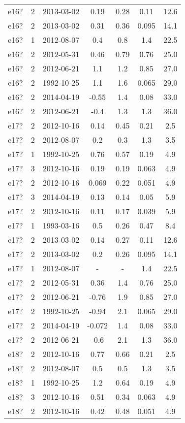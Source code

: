 \begin{table*}[htp]
\begin{tabular}{ccccccc}
e16? & 2 & 2013-03-02 & 0.19 & 0.28 & 0.11 & 12.6 \\
e16? & 2 & 2013-03-02 & 0.31 & 0.36 & 0.095 & 14.1 \\
e16? & 1 & 2012-08-07 & 0.4 & 0.8 & 1.4 & 22.5 \\
e16? & 2 & 2012-05-31 & 0.46 & 0.79 & 0.76 & 25.0 \\
e16? & 2 & 2012-06-21 & 1.1 & 1.2 & 0.85 & 27.0 \\
e16? & 2 & 1992-10-25 & 1.1 & 1.6 & 0.065 & 29.0 \\
e16? & 2 & 2014-04-19 & -0.55 & 1.4 & 0.08 & 33.0 \\
e16? & 2 & 2012-06-21 & -0.4 & 1.3 & 1.3 & 36.0 \\
e17? & 2 & 2012-10-16 & 0.14 & 0.45 & 0.21 & 2.5 \\
e17? & 2 & 2012-08-07 & 0.2 & 0.3 & 1.3 & 3.5 \\
e17? & 1 & 1992-10-25 & 0.76 & 0.57 & 0.19 & 4.9 \\
e17? & 3 & 2012-10-16 & 0.19 & 0.19 & 0.063 & 4.9 \\
e17? & 2 & 2012-10-16 & 0.069 & 0.22 & 0.051 & 4.9 \\
e17? & 3 & 2014-04-19 & 0.13 & 0.14 & 0.05 & 5.9 \\
e17? & 2 & 2012-10-16 & 0.11 & 0.17 & 0.039 & 5.9 \\
e17? & 1 & 1993-03-16 & 0.5 & 0.26 & 0.47 & 8.4 \\
e17? & 2 & 2013-03-02 & 0.14 & 0.27 & 0.11 & 12.6 \\
e17? & 2 & 2013-03-02 & 0.2 & 0.26 & 0.095 & 14.1 \\
e17? & 1 & 2012-08-07 & - & - & 1.4 & 22.5 \\
e17? & 2 & 2012-05-31 & 0.36 & 1.4 & 0.76 & 25.0 \\
e17? & 2 & 2012-06-21 & -0.76 & 1.9 & 0.85 & 27.0 \\
e17? & 2 & 1992-10-25 & -0.94 & 2.1 & 0.065 & 29.0 \\
e17? & 2 & 2014-04-19 & -0.072 & 1.4 & 0.08 & 33.0 \\
e17? & 2 & 2012-06-21 & -0.6 & 2.1 & 1.3 & 36.0 \\
e18? & 2 & 2012-10-16 & 0.77 & 0.66 & 0.21 & 2.5 \\
e18? & 2 & 2012-08-07 & 0.5 & 0.5 & 1.3 & 3.5 \\
e18? & 1 & 1992-10-25 & 1.2 & 0.64 & 0.19 & 4.9 \\
e18? & 3 & 2012-10-16 & 0.51 & 0.34 & 0.063 & 4.9 \\
e18? & 2 & 2012-10-16 & 0.42 & 0.48 & 0.051 & 4.9 \\

\end{tabular}
\end{table*}
